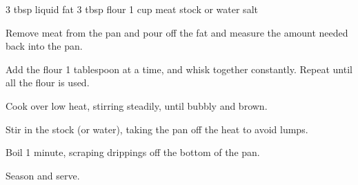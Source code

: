 \dishtype{\sauce}
\dishother{}
\begin{ingreds}
    3 tbsp liquid fat
    3 tbsp flour
    1 cup meat stock or water
    salt
\end{ingreds}
\begin{method}
    Remove meat from the pan and pour off the fat and measure the amount needed back into the pan.\par
    Add the flour 1 tablespoon at a time, and whisk together constantly. Repeat until all the flour is used.\par
    Cook over low heat, stirring steadily, until bubbly and brown.\par
    Stir in the stock (or water), taking the pan off the heat to avoid lumps.\par
    Boil 1 minute, scraping drippings off the bottom of the pan.\par
    Season and serve.
\end{method}